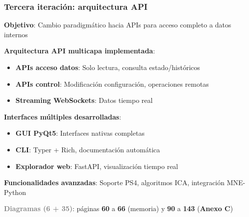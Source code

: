 \documentclass[10pt,thmsa]{beamer}
\theoremstyle{plain}
\begin{document}
\begin{frame}
\frametitle{Tercera iteración: arquitectura API}

\textbf{Objetivo}: Cambio paradigmático hacia APIs para acceso completo a datos internos

\vspace{0.5em}

\textbf{Arquitectura API multicapa implementada}:
\begin{itemize}
\item \textbf{APIs acceso datos}: Solo lectura, consulta estado/históricos
\item \textbf{APIs control}: Modificación configuración, operaciones remotas
\item \textbf{Streaming WebSockets}: Datos tiempo real
\end{itemize}

\vspace{0.5em}

\textbf{Interfaces múltiples desarrolladas}:
\begin{itemize}
\item \textbf{GUI PyQt5}: Interfaces nativas completas
\item \textbf{CLI}: Typer + Rich, documentación automática
\item \textbf{Explorador web}: FastAPI, visualización tiempo real
\end{itemize}

\vspace{0.5em}

\textbf{Funcionalidades avanzadas}: Soporte PS4, algoritmos ICA, integración MNE-Python

\vspace{2.0em}

\textcolor{gray}{\textbf{Diagramas (6 + 35)}}: páginas \textbf{60} a \textbf{66} (memoria) y \textbf{90} a \textbf{143} (\textbf{Anexo C})

\end{frame}
\end{document}
